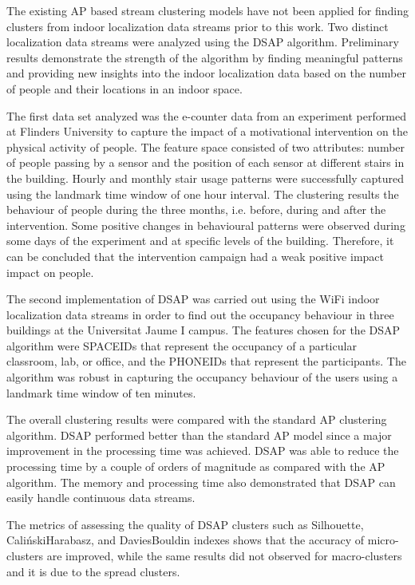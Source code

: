 The existing AP based stream clustering models have not been applied for finding clusters from indoor localization data streams prior to this work. Two distinct localization data streams were analyzed using the DSAP algorithm. Preliminary results demonstrate the strength of the algorithm by finding meaningful patterns and providing new insights into the indoor localization data based on the number of people and their locations in an indoor space. 


The first data set analyzed was the e-counter data from an experiment performed at Flinders University to capture the impact of a motivational intervention on the physical activity of people. The feature space consisted of two attributes: number of people passing by a sensor and the position of each sensor at different stairs in the building. Hourly and monthly stair usage patterns were successfully captured using the landmark time window of one hour interval. The clustering results the behaviour of people during the three months, i.e. before, during and after the intervention. Some positive changes in behavioural patterns were observed during some days of the experiment and at specific levels of the building. Therefore, it can be concluded that the intervention campaign had a weak positive impact impact on people.


The second implementation of DSAP was carried out using the WiFi indoor localization data streams in order to find out the occupancy behaviour in three buildings at the Universitat Jaume I campus. The features chosen for the DSAP algorithm were SPACEIDs that represent the occupancy of a particular classroom, lab, or office, and the PHONEIDs that represent the participants. The algorithm was robust in capturing the occupancy behaviour of the users using a landmark time window of ten minutes. 
 
The overall clustering results were compared with the standard AP clustering algorithm. DSAP performed better than the standard AP model since a major improvement in the processing time was achieved. DSAP was able to reduce the processing time by a couple of orders of magnitude as compared with the AP algorithm. The memory and processing time also demonstrated that DSAP can easily handle continuous data streams.

The metrics of assessing the quality of DSAP clusters such as Silhouette, Caliński\-Harabasz, and Davies\-Bouldin indexes shows that the accuracy of micro-clusters are improved, while the same results did not observed for macro-clusters and it is due to the spread clusters.

